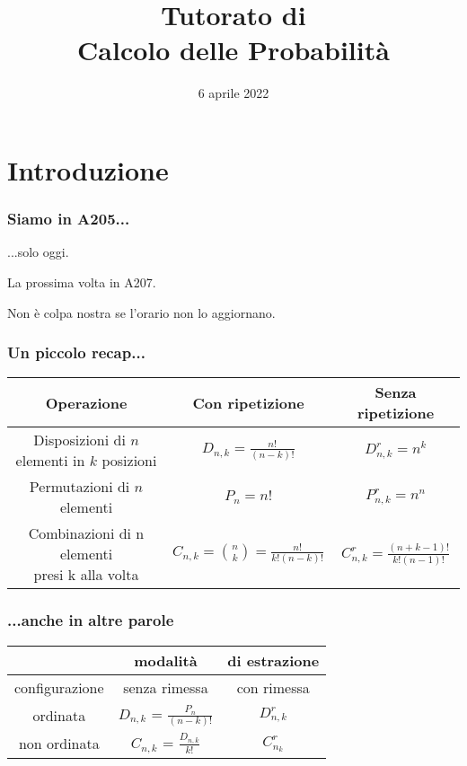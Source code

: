 \documentclass{beamer}
\title[Tutorato Probabilità]
{Tutorato di\\Calcolo delle Probabilità}
\author[DISI]{%
	\texorpdfstring{%
		\begin{columns}
			\column{.50\linewidth}
			\centering
			Camilla Righetti
			\column{.50\linewidth}
			\centering
			Matteo Franzil
		\end{columns}
	}{DISI}
}
\institute[UniTN]{
	\texorpdfstring{%
		\texttt{[image: drawable/logos/logo-disi.png]}
	}{University of Trento}\\
	\smallskip
	Corso di Laurea in Ingegneria Informatica, delle Comunicazioni ed Elettronica
}
\date[06/04/2022]{6 aprile 2022}
\begin{document}
\frame{\titlepage}

\section{Introduzione}

\begin{frame}
	\frametitle{Siamo in A205...}

	...solo oggi.

	\medskip

	La prossima volta in A207.

	\medskip

	Non è colpa nostra se l'orario non lo aggiornano.

\end{frame}

\begin{frame}[fragile]
	\frametitle{Un piccolo recap...}

	\begin{center}
		\begin{tabular}{|ccc|}
			\hline
			Operazione                   & Con ripetizione & Senza ripetizione \\ \hline
			\makecell{Disposizioni di                                          \\$n$ elementi\\in $k$ posizioni} & $D_{n,k} = \frac{n!}{(n-k)!}$ & $D^r_{n,k} = n^k$ \\
			Permutazioni di $n$ elementi & $P_n = n!$      & $P^r_{n,k} = n^n$ \\
			\makecell{Combinazioni di n elementi                               \\presi k alla volta} & $C_{n,k} = \binom{n}{k} = \frac{n!}{k!(n-k)!}$ & $C^r_{n,k} = \frac{(n+k-1)!}{k!(n-1)!}$ \\ \hline
		\end{tabular}
	\end{center}

\end{frame}

\begin{frame}[fragile]
	\frametitle{...anche in altre parole}

	\begin{center}

		\begin{tabular}{|ccc|}
			\hline
			               & modalità                           & di estrazione \\ \hline
			configurazione & senza rimessa                      & con rimessa   \\ \hline
			ordinata       & $D_{n, k}$ = $\frac{P_n}{(n-k)!}$  & $D^r_{n, k}$  \\
			non ordinata   & $C_{n, k}$ = $\frac{D_{n, k}}{k!}$ & $C^r_{n_k}$   \\ \hline
		\end{tabular}
	\end{center}

\end{frame}
\end{document}
